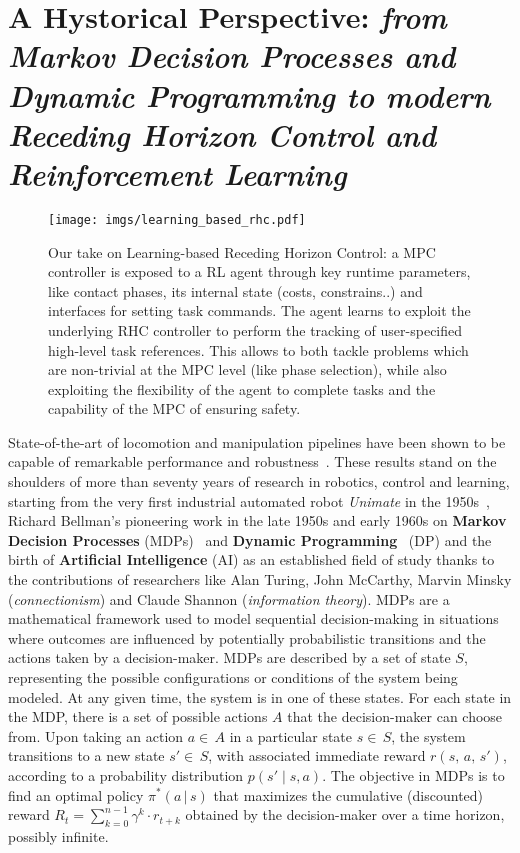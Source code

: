 \section{A Hystorical Perspective: \textnormal{\textit{from Markov Decision Processes and Dynamic Programming to modern Receding Horizon Control and Reinforcement Learning}}}
\begin{figure*}[t]
	\centering
	\vspace{0.1cm}
	\texttt{[image: imgs/learning\_based\_rhc.pdf]}
	\caption{Our take on Learning-based Receding Horizon Control: a MPC controller is exposed to a RL agent through key runtime parameters, like contact phases, its internal state (costs, constrains..) and interfaces for setting task commands. The agent learns to exploit the underlying RHC controller to perform the tracking of user-specified high-level task references. This allows to both tackle problems which are non-trivial at the MPC level (like phase selection), while also exploiting the flexibility of the agent to complete tasks and the capability of the MPC of ensuring safety.}
	\label{fig:lrhc_arch}
\end{figure*}
State-of-the-art of locomotion and manipulation pipelines have been shown to be capable of remarkable performance and robustness~\cite{rl:schneider2023learning,rl:miki2024learning,web::atlas_grip_boston_dyn,web::lrhc_boston_dyn}. These results stand on the shoulders of more than seventy years of research in robotics, control and learning, starting from the very first industrial automated robot \textit{Unimate} in the 1950s~\cite{origins:xu2018fourth}, Richard Bellman's pioneering work in the late 1950s and early 1960s on \textbf{Markov Decision Processes} (MDPs)~\cite{rl:bellman1957markovian} and \textbf{Dynamic Programming}~\cite{rl:bellman1960dynamic} (DP) and the birth of \textbf{Artificial Intelligence} (AI) as an established field of study thanks to the contributions of researchers like Alan Turing, John McCarthy, Marvin Minsky (\textit{connectionism}) and Claude Shannon (\textit{information theory}).
MDPs are a mathematical framework used to model sequential decision-making in situations where outcomes are influenced by potentially probabilistic transitions and the actions taken by a decision-maker. MDPs are described by a set of state $S$, representing the possible configurations or conditions of the system being modeled. At any given time, the system is in one of these states. For each state in the MDP, there is a set of possible actions $A$ that the decision-maker can choose from. Upon taking an action $a\in\,A$ in a particular state $s\in\,S$, the system transitions to a new state $s'\in\,S$, with associated immediate reward $r(s,\,a,\,s')$, according to a probability distribution $p(s'\mid s, a)$. The objective in MDPs is to find an optimal policy $\pi^{*}(a\,\vert\,s)$ that maximizes the cumulative (discounted) reward $R_t = \sum_{k=0}^{n-1} \gamma^k \cdot r_{t+k}$ obtained by the decision-maker over a time horizon, possibly infinite.
